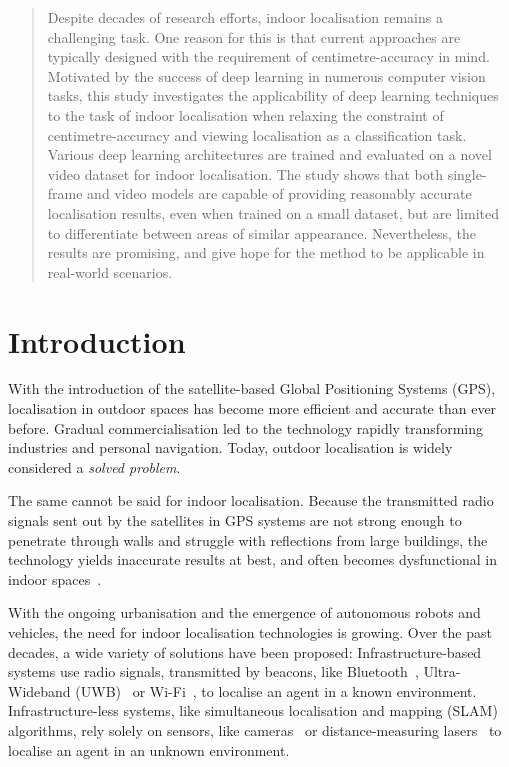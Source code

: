 \documentclass[a4paper]{article}
\begin{document}

\newpage

\tableofcontents
\newpage

\begin{abstract} %

Despite decades of research efforts, indoor localisation remains a challenging
task. One reason for this is that current approaches are typically designed with
the requirement of centimetre-accuracy in mind. Motivated by the success of deep
learning in numerous computer vision tasks, this study investigates the
applicability of deep learning techniques to the task of indoor localisation
when relaxing the constraint of centimetre-accuracy and viewing localisation as
a classification task. Various deep learning architectures are trained and
evaluated on a novel video dataset for indoor localisation. The study shows that
both single-frame and video models are capable of providing reasonably accurate
localisation results, even when trained on a small dataset, but are limited to
differentiate between areas of similar appearance. Nevertheless, the results are
promising, and give hope for the method to be applicable in real-world
scenarios.

\end{abstract}

\section{Introduction}
\label{sec:introduction}

With the introduction of the satellite-based Global Positioning Systems
(GPS), localisation in outdoor spaces has become more efficient and accurate
than ever before. Gradual commercialisation led to the technology rapidly
transforming industries and personal navigation. Today, outdoor localisation is
widely considered a \textit{solved problem}.

The same cannot be said for indoor localisation. Because the transmitted radio
signals sent out by the satellites in GPS systems are not strong enough to
penetrate through walls and struggle with reflections from large buildings, the
technology yields inaccurate results at best, and often becomes dysfunctional in
indoor spaces~\cite{survey1, survey2}.

With the ongoing urbanisation and the emergence of autonomous robots and
vehicles, the need for indoor localisation technologies is growing. Over the
past decades, a wide variety of solutions have been proposed:
Infrastructure-based systems use radio signals, transmitted by beacons, like
Bluetooth~\cite{bluetooth1, bluetooth2}, Ultra-Wideband (UWB)~\cite{uwb1, uwb2}
or Wi-Fi~\cite{survey1, survey2, wireless-positioning}, to localise an agent in
a known environment. Infrastructure-less systems, like simultaneous localisation
and mapping (SLAM) algorithms, rely solely on sensors, like
cameras~\cite{mono-slam, ptam, orb-slam} or distance-measuring
lasers~\cite{lidar-slam} to localise an agent in an unknown environment.
\end{document}
